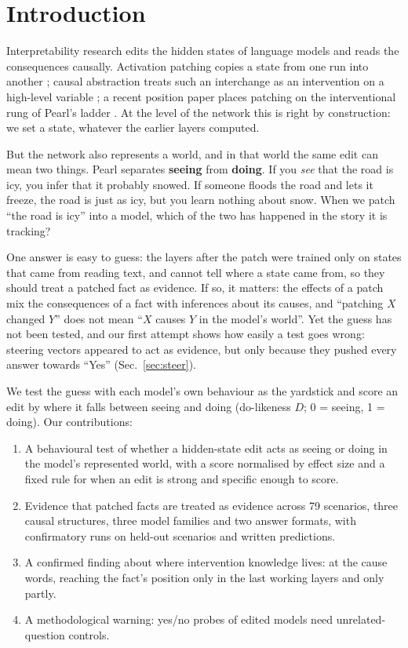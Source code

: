 \documentclass[conference]{IEEEtran}
\newcommand{\D}{\ensuremath{D}}
\begin{document}
\section{Introduction}
Interpretability research edits the hidden states of language models and reads the consequences causally. Activation patching copies a state from one run into another \cite{vig2020,meng2022,heimersheim2024}; causal abstraction treats such an interchange as an intervention on a high-level variable \cite{geiger2025}; a recent position paper places patching on the interventional rung of Pearl's ladder \cite{joshi2026}. At the level of the network this is right by construction: we set a state, whatever the earlier layers computed.

But the network also represents a world, and in that world the same edit can mean two things. Pearl \cite{pearl2009} separates \textbf{seeing} from \textbf{doing}. If you \emph{see} that the road is icy, you infer that it probably snowed. If someone floods the road and lets it freeze, the road is just as icy, but you learn nothing about snow. When we patch ``the road is icy'' into a model, which of the two has happened in the story it is tracking?

One answer is easy to guess: the layers after the patch were trained only on states that came from reading text, and cannot tell where a state came from, so they should treat a patched fact as evidence. If so, it matters: the effects of a patch mix the consequences of a fact with inferences about its causes, and ``patching $X$ changed $Y$'' does not mean ``$X$ causes $Y$ in the model's world''. Yet the guess has not been tested, and our first attempt shows how easily a test goes wrong: steering vectors appeared to act as evidence, but only because they pushed every answer towards ``Yes'' (Sec.~\ref{sec:steer}).

We test the guess with each model's own behaviour as the yardstick and score an edit by where it falls between seeing and doing (do-likeness \D; 0 = seeing, 1 = doing). Our contributions:
\begin{enumerate}
\item A behavioural test of whether a hidden-state edit acts as seeing or doing in the model's represented world, with a score normalised by effect size and a fixed rule for when an edit is strong and specific enough to score.
\item Evidence that patched facts are treated as evidence across 79 scenarios, three causal structures, three model families and two answer formats, with confirmatory runs on held-out scenarios and written predictions.
\item A confirmed finding about where intervention knowledge lives: at the cause words, reaching the fact's position only in the last working layers and only partly.
\item A methodological warning: yes/no probes of edited models need unrelated-question controls.
\end{enumerate}
\end{document}
